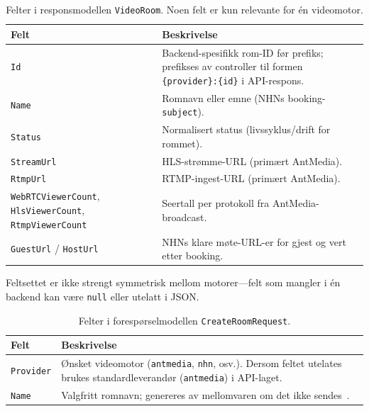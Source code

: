 \begin{table}[htbp]
\centering
\begin{threeparttable}
\caption{Felter i responsmodellen \texttt{VideoRoom}. Noen felt er kun relevante for én videomotor.}
\label{tab:model-videoroom}
\begin{tabular}{p{3.6cm} p{10cm}}
\toprule
\textbf{Felt} & \textbf{Beskrivelse} \\
\midrule
\texttt{Id} & Backend-spesifikk rom-ID før prefiks; prefikses av controller til formen \texttt{\{provider\}:\{id\}} i API-respons. \\
\texttt{Name} & Romnavn eller emne (NHNs booking-\texttt{subject}). \\
\texttt{Status} & Normalisert status (livssyklus/drift for rommet). \\
\texttt{StreamUrl} & HLS-strømme-URL (primært AntMedia). \\
\texttt{RtmpUrl} & RTMP-ingest-URL (primært AntMedia). \\
\texttt{WebRTCViewerCount}, \texttt{HlsViewerCount}, \texttt{RtmpViewerCount} & Seertall per protokoll fra AntMedia-broadcast. \\
\texttt{GuestUrl} / \texttt{HostUrl} & NHNs klare møte-URL-er for gjest og vert etter booking. \\
\bottomrule
\end{tabular}
\begin{tablenotes}
\footnotesize
\item Feltsettet er ikke strengt symmetrisk mellom motorer—felt som mangler i én backend kan være \texttt{null} eller utelatt i JSON.
\end{tablenotes}
\end{threeparttable}
\end{table}

\begin{table}[htbp]
\centering
\caption{Felter i forespørselmodellen \texttt{CreateRoomRequest}.}
\label{tab:model-createroom}
\begin{tabular}{p{3.6cm} p{10cm}}
\toprule
\textbf{Felt} & \textbf{Beskrivelse} \\
\midrule
\texttt{Provider} & Ønsket videomotor (\texttt{antmedia}, \texttt{nhn}, osv.). Dersom feltet utelates brukes standardleverandør (\texttt{antmedia}) i API-laget. \\
\texttt{Name} & Valgfritt romnavn; genereres av mellomvaren om det ikke sendes~\cite{hdo_kravspec}. \\
\bottomrule
\end{tabular}
\end{table}

